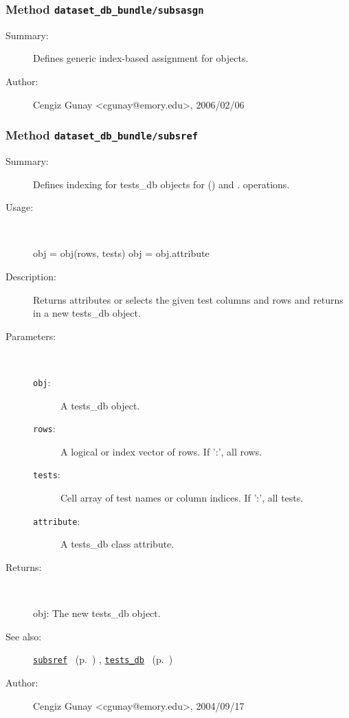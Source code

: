 \subsubsection[Method \texttt{subsasgn}]{Method \texttt{dataset\_db\_bundle/subsasgn}}%
%
\label{ref_dataset_db_bundle__subsasgn}%
\hypertarget{ref_dataset_db_bundle__subsasgn}{}%
\begin{description}
\item[Summary:]Defines generic index-based assignment for objects.
%
%
%
%
%
%
%
\item[Author:]%
Cengiz Gunay <cgunay@emory.edu>, 2006/02/06
%
\end{description}
\methodline%
\subsubsection[Method \texttt{subsref}]{Method \texttt{dataset\_db\_bundle/subsref}}%
%
\label{ref_dataset_db_bundle__subsref}%
\hypertarget{ref_dataset_db_bundle__subsref}{}%
\begin{description}
\item[Summary:]Defines indexing for tests\_db objects for () and . operations. 
%
\item[Usage:]~%
\begin{lyxcode}%
obj = obj(rows, tests)
 obj = obj.attribute
%
\end{lyxcode}%
%
\item[Description:]%
Returns attributes or selects the given test columns and rows
 and returns in a new tests\_db object.
\item[Parameters:]~
\begin{description}%
\item[\texttt{obj}:]
 A tests\_db object.
\item[\texttt{rows}:]
 A logical or index vector of rows. If ':', all rows.
\item[\texttt{tests}:]
 Cell array of test names or column indices. If ':', all tests.
\item[\texttt{attribute}:]
 A tests\_db class attribute.
\end{description}%
%
\item[Returns:
]~

	obj: The new tests\_db object.
%
%
\item[See also:]%
\hyperlink{ref_subsref}{\texttt{subsref}}%
\ (p.~\pageref{ref_subsref})%
%
, \hyperlink{ref_tests_db}{\texttt{tests\_db}}%
\ (p.~\pageref{ref_tests_db})%
%
%
\item[Author:]%
Cengiz Gunay <cgunay@emory.edu>, 2004/09/17
%
\end{description}
\methodline%
